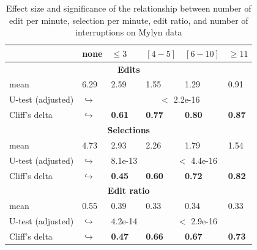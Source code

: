 \documentclass[times]{smrauth}
\begin{document}
\begin{table}[ht!]
\tiny
\renewcommand{\arraystretch}{1.3}
\caption{Effect size and significance of the relationship between number of edit per minute, selection per minute, edit ratio, and number of interruptions on Mylyn data} 
\label{tbl:p_value}
\centering
\begin{tabular}{l | p{0.75cm} | p{1.2cm} | p{1.2cm} | p{1.2cm} |p{1.2cm}} 

   & none & $\leq 3$ & $[4 - 5]$ & $[6 - 10]$ & $\geq 11$  \\  
  \hline
  \multicolumn{6}{c}{\textbf{Edits}} \\
  \hline
  mean & 6.29 &	2.59 & 1.55 & 1.29 & 0.91  \\ 
   \cline{3-6} 
  U-test (adjusted) & $\hookrightarrow$ & \multicolumn{4}{c}{$<$ 2.2e-16} \\
  \cline{3-6} 
  Cliff's delta & $\hookrightarrow$	& \textbf{0.61} & \textbf{0.77} & \textbf{0.80} & \textbf{0.87}    \\
  \hline
  
  
  \multicolumn{6}{c}{\textbf{Selections}} \\
  \hline 
  mean & 4.73 &	2.93 & 2.26 & 1.79 & 1.54  \\ 
     \cline{3-6} 
    U-test (adjusted) & $\hookrightarrow$ & 8.1e-13 & \multicolumn{3}{c}{$<$ 4.4e-16} \\
    
  \cline{3-6} 
  Cliff's delta & $\hookrightarrow$	& \textbf{0.45} & \textbf{0.60} & \textbf{0.72} & \textbf{0.82} \\  
\hline


  \multicolumn{6}{c}{\textbf{Edit ratio}} \\
  \hline 
  mean & 0.55 & 0.39 & 0.33 & 0.34 & 0.33 \\ 
  \cline{3-6} 
     \cline{3-6} 
    U-test (adjusted) & $\hookrightarrow$ & 4.2e-14& \multicolumn{3}{c}{$<$ 2.9e-16} \\
    \cline{3-6} 
    Cliff's delta & $\hookrightarrow$ & \textbf{0.47} & \textbf{0.66} & \textbf{0.67} & \textbf{0.73} \\ 
\hline

\end{tabular}
\end{table}
\end{document}
